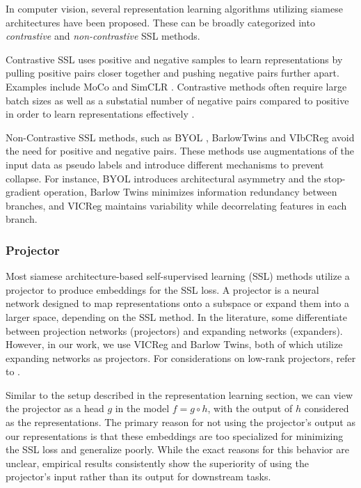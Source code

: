 \documentclass[../../thesis.tex]{subfiles}
\begin{document}
In computer vision, several representation learning algorithms utilizing siamese architectures have been proposed. These can be broadly categorized into \textit{contrastive} and \textit{non-contrastive} SSL methods.\newline

Contrastive SSL uses positive and negative samples to learn representations by pulling positive pairs closer together and pushing negative pairs further apart. Examples include MoCo \cite{he2020momentum} and SimCLR \cite{chen2020simple}. Contrastive methods often require large batch sizes as well as a substatial number of negative pairs compared to positive in order to learn representations effectively \cite{lee2024computer}.\newline

Non-Contrastive SSL methods, such as BYOL \cite{grill2020bootstrap}, BarlowTwins \cite{zbontar2021barlow} and VIbCReg \cite{lee2024computer} avoid the need for positive and negative pairs. These methods use augmentations of the input data as pseudo labels and introduce different mechanisms to prevent collapse. For instance, BYOL introduces architectural asymmetry and the stop-gradient operation, Barlow Twins minimizes information redundancy between branches, and VICReg maintains variability while decorrelating features in each branch.

\subsubsection{Projector}

Most siamese architecture-based self-supervised learning (SSL) methods utilize a projector to produce embeddings for the SSL loss. A projector is a neural network designed to map representations onto a subspace or expand them into a larger space, depending on the SSL method. In the literature, some differentiate between projection networks (projectors) and expanding networks (expanders). However, in our work, we use VICReg and Barlow Twins, both of which utilize expanding networks as projectors. For considerations on low-rank projectors, refer to \cite{gupta2022understanding}.\newline

Similar to the setup described in the representation learning section, we can view the projector as a head $g$ in the model $f = g\circ h$, with the output of $h$ considered as the representations. The primary reason for not using the projector's output as our representations is that these embeddings are too specialized for minimizing the SSL loss and generalize poorly. While the exact reasons for this behavior are unclear, empirical results consistently show the superiority of using the projector's input rather than its output for downstream tasks.\newline
\end{document}
